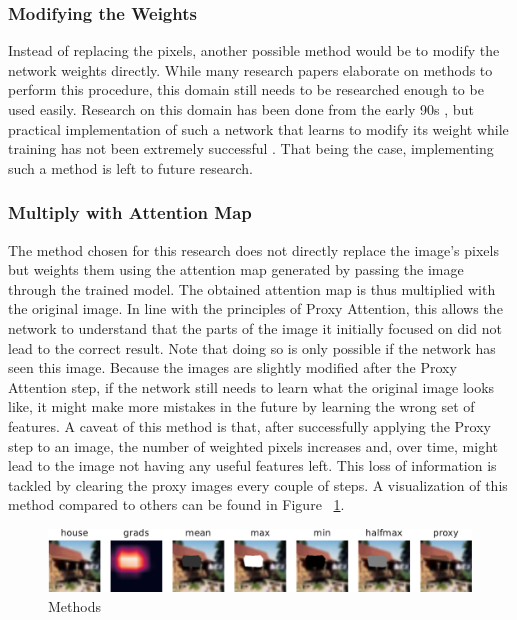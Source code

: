 \subsubsection{}


\subsubsection{Modifying the Weights}
Instead of replacing the pixels, another possible method would be to modify the network weights directly. While many research papers elaborate on methods to perform this procedure, this domain still needs to be researched enough to be used easily. Research on this domain has been done from the early 90s \cite{schmidhuberSelfReferentialWeightMatrix1993}, but practical implementation of such a network that learns to modify its weight while training has not been extremely successful \cite{irieModernSelfReferentialWeight2022}.
That being the case, implementing such a method is left to future research.


\subsubsection{Multiply with Attention Map}
The method chosen for this research does not directly replace the image's pixels but weights them using the attention map generated by passing the image through the trained model.
The obtained attention map is thus multiplied with the original image. In line with the principles of Proxy Attention, this allows the network to understand that the parts of the image it initially focused on did not lead to the correct result. Note that doing so is only possible if the network has seen this image. Because the images are slightly modified after the Proxy Attention step, if the network still needs to learn what the original image looks like, it might make more mistakes in the future by learning the wrong set of features.
A caveat of this method is that, after successfully applying the Proxy step to an image, the number of weighted pixels increases and, over time, might lead to the image not having any useful features left. This loss of information is tackled by clearing the proxy images every couple of steps.
A visualization of this method compared to others can be found in Figure ~\ref{fig:methods}.

\begin{figure}[h]
    \centering
    \includegraphics[width=1\textwidth]{images/methods.pdf}
    \caption{Methods}
    \label{fig:methods}
\end{figure}

